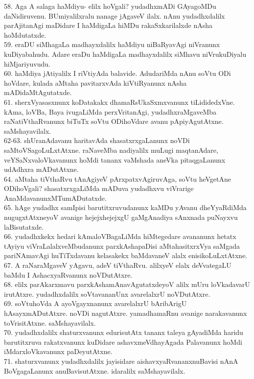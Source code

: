 \documentclass{article}
\begin{document}
58. Aga A salaga haMdiyu- elilx hoVgali? yudadhxmADi GAyagoMDu daNidiruvenu. BUmiyalilxralu nanage jAgaveV ilalx. nAnu yudadhxdalilx parAjitanAgi maDidare I haMdigaLa hiMDu rakaSxkarilalxde nAsha hoMdutatxde.\\
59. eraDU siMhagaLa madhayxdalilx haMdiyu niBaRyavAgi niVranunx kuDiyabahudu. Adare eraDu haMdigaLa madhayxdalilx siMhavu niVrukuDiyalu hiMjariyuvudu.\\
60. haMdiya jAtiyalilx I riVtiyAda balavide. AdudariMda nAnu soVtu ODi hoVdare, kulada aMtaha pavitarxvAda kiVtiRyanunx nAsha mADidaMtAgutatxde.\\
61. sherxVyasasxnunx koDatakakx dhamaRsUkaSxmxvanunx tiLididedxVne. kAma, loVBa, Baya ivugaLiMda perxVritanAgi, yudadhxraMgaveMba raNatiVthaRvanunx biTuTx soVtu ODihoVdare avanu pApiyAgutAtxne. saMshayavilalx.\\
62-63. shUranAdavanu haritavAda shasatxrxgaLanunx noVDi saMtoVSagoLuLxtAtxne. raNaveMba nadiyalilx muLugi maqtanAdare, veYSaNxvaloVkavanunx hoMdi tananx vaMshada aneVka pitaqgaLanunx udAdhxra mADutAtxne.\\
64. aMtaha tiVthaRvu tAnAgiyeV pArxpatxvAgiruvAga, soVtu heVgetAne ODihoVgali? shasatxrxgaLiMda mADuva yudadhxvu viVrarige AnaMdavanunxMTumADutatxde.\\
65. hAge yudadhx samIpisi barutitxruvudanunx kaMDu yAvanu dheYyaRdiMda nugugxtAtxneyoV avanige hejejxhejejxgU gaMgAnadiya sAnxnada puNayxvu laBisutatxde.\\
66. yudadhxkekx hedari kAmaloVBagaLiMda hiMtegedare avananunx hetatx tAyiyu viVraLalalxveMbudanunx parxkAshapaDisi aMtahasitxrxVya saMgada pariNAmavAgi huTiTxdavanu kelasakekx baMdavaneV alalx enisikoLuLxtAtxne.\\
67. A raNaraMgaveV yAgavu, adeV tiVthaRvu. alilxyeV elalx deVvategaLU baMdu I AshacxyaRvanunx noVDutAtxre.\\
68. elilx parAkarxmavu parxkAshamAnavAgutatxdeyoV alilx mUru loVkadavarU irutAtxre. yudadhxdalilx soVtavananUnx avarelalxrU noVDutAtxre.\\
69. soVtuhoVda A ayoVgayxnanunx avarelalxrU bAribArigU hAsayxmADutAtxre. noVDi nagutAtxre. yamadhamaRnu avanige narakavanunx toVrisitAtxne. saMshayavilalx.\\
70. yudadhxdalilx shaturxvanunx edurisutAtx tananx taleya gAyadiMda haridu barutitxruva rakatxvanunx kuDidare ashavxmeVdhayAgada Palavanunx hoMdi iMdarxloVkavanunx paDeyutAtxne.\\
71. shaturxvanunx yudadhxdalilx jayisidare aishavxyaRvananxnuBavisi nAnA BoVgagaLanunx anuBavisutAtxne. idaralilx saMshayavilalx.\\
\end{document}
